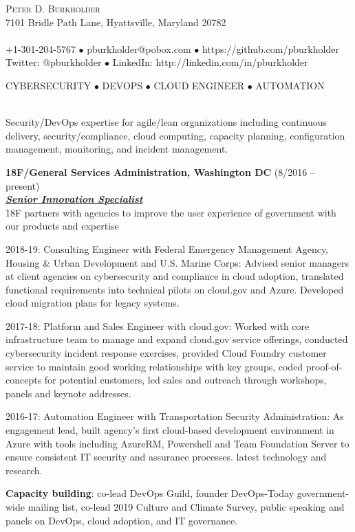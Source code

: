 \documentclass{article}
\newcommand{\lineunder}{\vspace*{-8pt} \\ \hspace*{-18pt} \hrulefill \\}
\newcommand{\header}[1]{{\hspace*{-15pt}\vspace*{6pt} \textsc{#1}} \vspace*{-6pt} \lineunder}
\newcommand{\centeredheader}[1]{
  \vspace*{6pt}
  \begin{center}
    \textsc{#1}
    \lineunder
  \end{center}
}
\newcommand{\employer}[3]{{ \textbf{#1} (#2)\\ \underline{\textbf{\emph{#3}}}\\ \nopagebreak }}
\newcommand{\contact}[3]{
    \vspace*{-8pt}
    \begin{center}
        {\LARGE \scshape {#1}}\\
        #2 \lineunder
        #3
    \end{center}
    \vspace*{-8pt}
}
\newenvironment{achievements}{\begin{list}{\topsep 0pt \itemsep -2pt}} {\vspace*{4pt}\end{list}}
\begin{document}
\smallskip
\vspace*{-44pt}

\contact{Peter D. Burkholder}
  {7101 Bridle Path Lane, Hyattsville, Maryland 20782}
  {+1-301-204-5767 $\bullet$ pburkholder@pobox.com  $\bullet$ https://github.com/pburkholder
    \linebreak Twitter: @pburkholder $\bullet$ LinkedIn: http://linkedin.com/in/pburkholder }

\centeredheader{CYBERSECURITY $\bullet$ DEVOPS $\bullet$ CLOUD ENGINEER $\bullet$ AUTOMATION}
  Security/DevOps expertise for agile/lean organizations including continuous delivery, 
  security/compliance, cloud computing, capacity planning, configuration management, 
  monitoring, and incident management.

\smallskip
\vspace*{16pt}

\employer{18F/General Services Administration, Washington DC}{8/2016 -- present}{Senior Innovation Specialist}
18F partners with agencies to improve the user experience of government with our products and expertise
\begin{achievements}
  \item 2018-19: Consulting Engineer with Federal Emergency Management Agency, Housing \&
    Urban Development and U.S. Marine Corps: Advised senior managers at client agencies 
    on cybersecurity and compliance in cloud adoption, translated functional requirements 
    into technical pilots on cloud.gov and Azure. Developed cloud migration plans for legacy systems.
  \item 2017-18: Platform and Sales Engineer with cloud.gov: Worked with core infrastructure team to manage and expand 
    cloud.gov service offerings, conducted cybersecurity incident response exercises, provided Cloud Foundry 
    customer service to maintain good working relationships with key groups, coded proof-of-concepts for
    potential customers, led sales and outreach through workshops, panels and keynote addresses.
  \item 2016-17: Automation Engineer with Transportation Security Administration: As engagement lead, 
  built agency's first cloud-based development environment in Azure with tools including
  AzureRM, Powershell and Team Foundation Server to ensure consistent IT security and assurance processes.
  latest technology and research.
  \item \textbf{Capacity building}: co-lead DevOps Guild, founder DevOps-Today government-wide mailing list, 
    co-lead 2019 Culture and Climate Survey, public speaking and panels on DevOps, cloud adoption, and IT governance.

  
\end{achievements}
\end{document}

